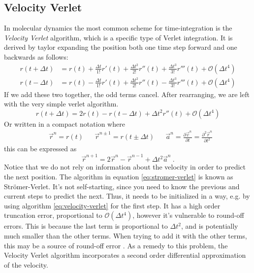 \documentclass[twoside,english]{uiofysmaster}
\begin{document}
\subsection{Velocity Verlet}
In molecular dynamics the most common scheme for time-integration is the \textit{Velocity Verlet} algorithm, which is a specific type of Verlet integration.
It is derived by taylor expanding the position both one time step forward and one backwards as follows: 
\begin{align}
	r(t+\Delta t) &= r(t) + \frac{\Delta t}{1!}r'(t) + \frac{\Delta t^2}{2!}r''(t) + \frac{\Delta t^3}{3!}r'''(t) + \mathcal{O}(\Delta t^4)\\[1ex]
	r(t-\Delta t) &= r(t) - \frac{\Delta t}{1!}r'(t) + \frac{\Delta t^2}{2!}r''(t) - \frac{\Delta t^3}{3!}r'''(t) + \mathcal{O}(\Delta t^4)
\end{align}
If we add these two together, the odd terms cancel. 
After rearranging, we are left with the very simple verlet algorithm. 
\begin{equation}
r(t+\Delta t) = 2r(t) - r(t-\Delta t) + \Delta t^2r''(t) + \mathcal{O}(\Delta t^4)
\end{equation}
Or written in a compact notation where
\begin{align}
	&\vec{r}^n = r(t)& &\vec{r}^{n\pm 1} = r(t\pm \Delta t)&  &\vec{a}^n = \frac{\partial \vec{v}^n}{\partial t} = \frac{\partial^2 \vec{r}^n}{\partial t ^2}
\end{align}
this can be expressed as
\begin{equation}\label{eq:stromer-verlet}
\vec{r}^{n+1} = 2\vec{r}^n - \vec{r}^{n-1} + \Delta t^2\vec{a}^n ~.
\end{equation}
Notice that we do not rely on information about the velocity in order to predict the next position. 
The algorithm in equation \eqref{eq:stromer-verlet} is known as Strömer-Verlet. 
It's not self-starting, since you need to know the previous and current steps to predict the next. 
Thus, it needs to be initialized in a way, e.g. by using algorithm \eqref{eq:velocity-verlet} for the first step. 
It has a high order truncation error, proportional to $\mathcal{O}(\Delta t^4)$, however it's vulnerable to round-off errors. 
This is because the last term is proportional to $\Delta t^2$, and is potentially much smaller than the other terms.
When trying to add it with the other terms, this may be a source of round-off error \cite{MATINF1100}. 
As a remedy to this problem, the Velocity Verlet algorithm incorporates a second order differential approximation of the velocity.
\end{document}
